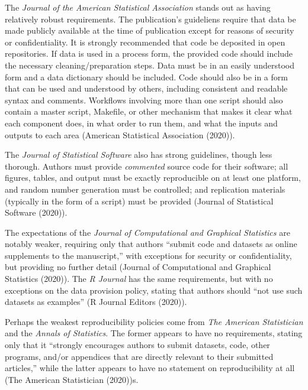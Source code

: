 \documentclass[12pt,twoside]{reedthesis}
\begin{document}
The \emph{Journal of the American Statistical Association} stands out as
having relatively robust requirements. The publication's guideliens
require that data be made publicly available at the time of publication
except for reasons of security or confidentiality. It is strongly
recommended that code be deposited in open repositories. If data is used
in a process form, the provided code should include the necessary
cleaning/preparation steps. Data must be in an easily understood form
and a data dictionary should be included. Code should also be in a form
that can be used and understood by others, including consistent and
readable syntax and comments. Workflows involving more than one script
should also contain a master script, Makefile, or other mechanism that
makes it clear what each component does, in what order to run them, and
what the inputs and outputs to each area (American Statistical
Association (2020)).

The \emph{Journal of Statistical Software} also has strong guidelines,
though less thorough. Authors must provide \emph{commented} source code
for their software; all figures, tables, and output must be exactly
reproducible on at least one platform, and random number generation must
be controlled; and replication materials (typically in the form of a
script) must be provided (Journal of Statistical Software (2020)).

The expectations of the \emph{Journal of Computational and Graphical
Statistics} are notably weaker, requiring only that authors ``submit
code and datasets as online supplements to the manuscript,'' with
exceptions for security or confidentiality, but providing no further
detail (Journal of Computational and Graphical Statistics (2020)). The
\emph{R Journal} has the same requirements, but with no exceptions on
the data provision policy, stating that authors should ``not use such
datasets as examples'' (R Journal Editors (2020)).

Perhaps the weakest reproducibility policies come from \emph{The
American Statistician} and the \emph{Annals of Statistics}. The former
appears to have no requirements, stating only that it ``strongly
encourages authors to submit datasets, code, other programs, and/or
appendices that are directly relevant to their submitted articles,''
while the latter appears to have no statement on reproducibility at all
(The American Statistician (2020))s.
\end{document}
